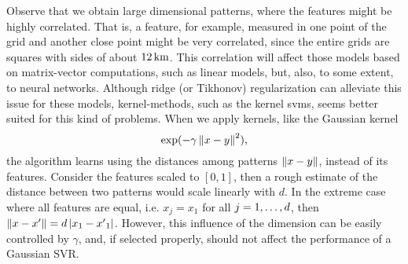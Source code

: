 %
Observe that we obtain large dimensional patterns, where the features might be highly correlated. That is, a feature,  for example, measured in one point of the grid and another close point might be very correlated, since the entire grids are squares with sides of about $\SI{12}{\kilo\metre}$.
This correlation will affect those models based on matrix-vector computations, such as linear models, but, also, to some extent, to neural networks.
Although ridge (or Tikhonov) regularization can alleviate this issue for these models, kernel-methods, such as the kernel \acrshort{svm}s, seems better suited for this kind of problems.
When we apply kernels, like the Gaussian kernel $$\exp({-\gamma \left\lVert x-y\right\rVert^2}),$$ the algorithm learns using the distances among patterns $\left\lVert x - y\right\rVert$, instead of its features.
%
Consider the features scaled to $[0, 1]$, then a rough estimate of the distance between two patterns would scale linearly with $d$. In the extreme case where all features are equal, i.e. $x_j = x_1$ for all $j=1, \ldots, d$, then $\left\lVert x - x'\right\rVert = d \left|x_1 - {x'}_1\right| $.
However, this influence of the dimension can be easily controlled by $\gamma$, and, if selected properly, should not affect the performance of a Gaussian SVR.

